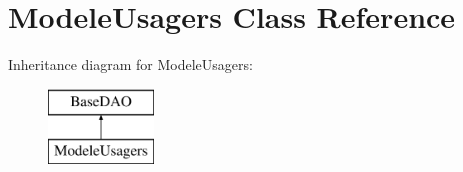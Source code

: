 \hypertarget{class_modele_usagers}{}\section{Modele\+Usagers Class Reference}
\label{class_modele_usagers}
Inheritance diagram for Modele\+Usagers\+:\begin{figure}[H]
\begin{center}
\leavevmode
\includegraphics[height=2.000000cm]{class_modele_usagers}
\end{center}
\end{figure}
